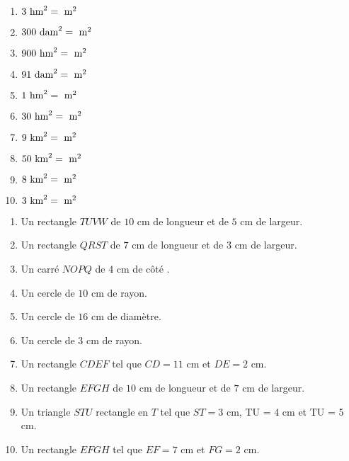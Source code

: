 \documentclass[a4paper,11pt,fleqn]{article}
\begin{document}

\begin{multicols}{2}
\begin{enumerate}[itemsep=2em]
	\item $ 3~\text{hm}^2 = \dotfill ~\text{m}^2$
	\item $ 300~\text{dam}^2 = \dotfill ~\text{m}^2$
	\item $ 900~\text{hm}^2 = \dotfill ~\text{m}^2$
	\item $ 91~\text{dam}^2 = \dotfill ~\text{m}^2$
	\item $ 1~\text{hm}^2 = \dotfill ~\text{m}^2$
	\item $ 30~\text{hm}^2 = \dotfill ~\text{m}^2$
	\item $ 9~\text{km}^2 = \dotfill ~\text{m}^2$
	\item $ 50~\text{km}^2 = \dotfill ~\text{m}^2$
	\item $ 8~\text{km}^2 = \dotfill ~\text{m}^2$
	\item $ 3~\text{km}^2 = \dotfill ~\text{m}^2$
\end{enumerate}
\end{multicols}


\begin{multicols}{2}
\begin{enumerate}
	\item Un rectangle $TUVW$ de $10$ cm de longueur et de $5$ cm de largeur.
	\item Un rectangle $QRST$ de $7$ cm de longueur et de $3$ cm de largeur.
	\item Un carré $NOPQ$ de $4$ cm de côté .
	\item Un cercle de $10$ cm de rayon.
	\item Un cercle de $16$ cm de diamètre.
	\item Un cercle de $3$ cm de rayon.
	\item Un rectangle $CDEF$ tel que $CD = 11$ cm et $DE = 2$ cm.
	\item Un rectangle $EFGH$ de $10$ cm de longueur et de $7$ cm de largeur.
	\item Un triangle $STU$ rectangle en $T$ tel que $ST = 3$ cm, TU = 4 cm et TU = 5 cm.
	\item Un rectangle $EFGH$ tel que $EF = 7$ cm et $FG = 2$ cm.
\end{enumerate}
\end{multicols}
\end{document}
